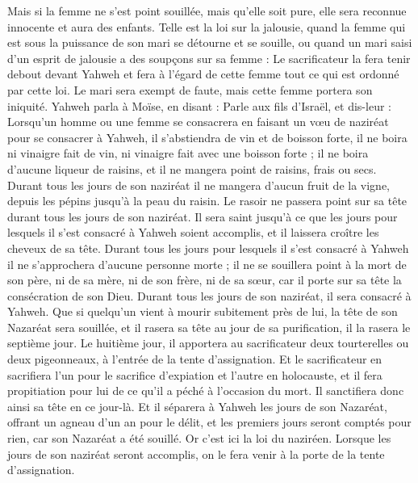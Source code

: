 \begin{multicols}{2}
Mais si la femme ne s'est point souillée, mais qu'elle soit pure, elle sera reconnue innocente et aura des enfants.
Telle est la loi sur la jalousie, quand la femme qui est sous la puissance de son mari se détourne et se souille,
ou quand un mari saisi d'un esprit de jalousie a des soupçons sur sa femme : Le sacrificateur la fera tenir debout devant Yahweh et fera à l'égard de cette femme tout ce qui est ordonné par cette loi.
Le mari sera exempt de faute, mais cette femme portera son iniquité.
\VerseOne{}Yahweh parla à Moïse, en disant :
Parle aux fils d'Israël, et dis-leur : Lorsqu'un homme ou une femme se consacrera en faisant un vœu de naziréat pour se consacrer à Yahweh,
il s'abstiendra de vin et de boisson forte, il ne boira ni vinaigre fait de vin, ni vinaigre fait avec une boisson forte ; il ne boira d'aucune liqueur de raisins, et il ne mangera point de raisins, frais ou secs.
Durant tous les jours de son naziréat il ne mangera d'aucun fruit de la vigne, depuis les pépins jusqu'à la peau du raisin.
Le rasoir ne passera point sur sa tête durant tous les jours de son naziréat. Il sera saint jusqu'à ce que les jours pour lesquels il s'est consacré à Yahweh soient accomplis, et il laissera croître les cheveux de sa tête.
Durant tous les jours pour lesquels il s'est consacré à Yahweh il ne s'approchera d'aucune personne morte ;
il ne se souillera point à la mort de son père, ni de sa mère, ni de son frère, ni de sa sœur, car il porte sur sa tête la consécration de son Dieu.
Durant tous les jours de son naziréat, il sera consacré à Yahweh.
Que si quelqu'un vient à mourir subitement près de lui, la tête de son Nazaréat sera souillée, et il rasera sa tête au jour de sa purification, il la rasera le septième jour.
Le huitième jour, il apportera au sacrificateur deux tourterelles ou deux pigeonneaux, à l'entrée de la tente d'assignation.
Et le sacrificateur en sacrifiera l'un pour le sacrifice d'expiation et l'autre en holocauste, et il fera propitiation pour lui de ce qu'il a péché à l'occasion du mort. Il sanctifiera donc ainsi sa tête en ce jour-là.
Et il séparera à Yahweh les jours de son Nazaréat, offrant un agneau d'un an pour le délit, et les premiers jours seront comptés pour rien, car son Nazaréat a été souillé.
Or c'est ici la loi du naziréen. Lorsque les jours de son naziréat seront accomplis, on le fera venir à la porte de la tente d'assignation.

\end{multicols}
